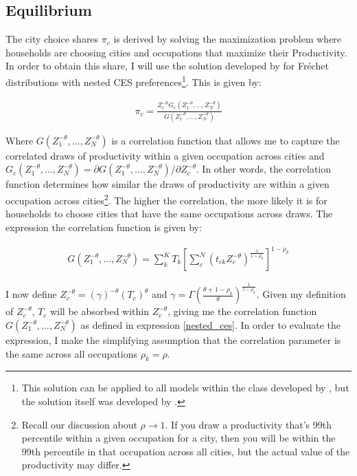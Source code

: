\documentclass[10pt]{article}
\begin{document}
\subsection{Equilibrium}

The city choice shares $\pi_c$ is derived by solving the maximization problem where households are choosing cities and occupations that maximize their Productivity. In order to obtain this share, I will use the solution developed by \cite{lindandramondo} for Fr\'{e}chet distributions with nested CES preferences\footnote{This solution can be applied to all models within the class developed by \cite{ek}, but the solution itself was developed by \cite{lindandramondo}.}. This is given by:

\begin{align*}
    \pi_c = \frac{Z_c^{- \theta} G_c(Z_1^{- \theta}, \dots, Z_N^{- \theta})}{G(Z_1^{- \theta}, \dots, Z_N^{- \theta})}
\end{align*}

Where $G(Z_1^{- \theta}, \dots, Z_N^{- \theta})$ is a correlation function that allows me to capture the correlated draws of productivity within a given occupation across cities and $G_c (Z_1^{- \theta}, \dots, Z_N^{- \theta}) = \partial G(Z_1^{- \theta}, \dots, Z_N^{- \theta}) / \partial Z_c^{- \theta}$. In other words, the correlation function determines how similar the draws of productivity are within a given occupation across cities\footnote{Recall our discussion about $\rho \rightarrow 1$. If you draw a productivity that's 99th percentile within a given occupation for a city, then you will be within the 99th percentile in that occupation across all cities, but the actual value of the productivity may differ.}. The higher the correlation, the more likely it is for households to choose cities that have the same occupations across draws. The expression the correlation function is given by:

\begin{align}
    G(Z_1^{- \theta}, \dots, Z_N^{- \theta}) = \sum_{k}^{K} T_k \left[ \sum_{c}^{N} (t_{ck} Z_c^{- \theta})^{\frac{1}{1 - \rho_k}} \right]^{1 - \rho_k}
    \label{nested_ces}
\end{align}

I now define $Z_c^{- \theta} = (\gamma)^{- \theta} (T_c)^{\theta}$ and $\gamma = \Gamma (\frac{\theta + 1 - \rho_k}{\theta})^{\frac{1}{1 - \rho_k}}$. Given my definition of $Z_c^{- \theta}$, $T_c$ will be absorbed within $Z_c^{- \theta}$, giving me the correlation function $G(Z_1^{- \theta}, \dots, Z_N^{- \theta})$ as defined in expression \ref{nested_ces}. In order to evaluate the expression, I make the simplifying assumption that the correlation parameter is the same across all occupations $\rho_k = \rho$.
\end{document}
